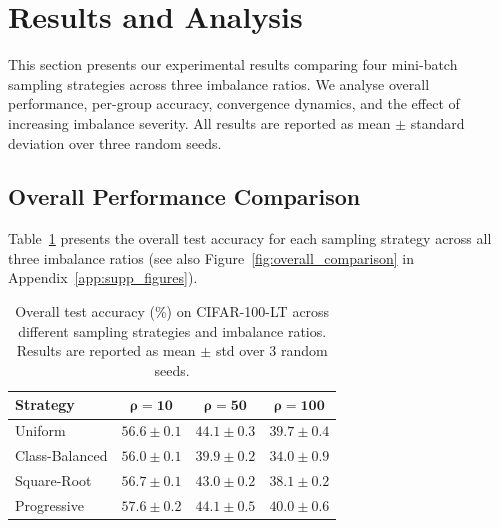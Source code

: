 \documentclass[12pt,a4paper]{article}
\begin{document}
\section{Results and Analysis}
\label{sec:results}
This section presents our experimental results comparing four mini-batch sampling strategies across three imbalance ratios. We analyse overall performance, per-group accuracy, convergence dynamics, and the effect of increasing imbalance severity. All results are reported as mean $\pm$ standard deviation over three random seeds.

\subsection{Overall Performance Comparison}

Table~\ref{tab:overall_results} presents the overall test accuracy for each sampling strategy across all three imbalance ratios (see also Figure~\ref{fig:overall_comparison} in Appendix~\ref{app:supp_figures}).

\begin{table}[H]
    \centering
    \caption{Overall test accuracy (\%) on CIFAR-100-LT across different sampling strategies and imbalance ratios. Results are reported as mean $\pm$ std over 3 random seeds.}
    \label{tab:overall_results}
    \begin{tabular}{lccc}
        \toprule
        \textbf{Strategy} & $\boldsymbol{\rho = 10}$ & $\boldsymbol{\rho = 50}$ & $\boldsymbol{\rho = 100}$ \\
        \midrule
        Uniform        & $56.6 \pm 0.1$ & $44.1 \pm 0.3$ & $39.7 \pm 0.4$ \\
        Class-Balanced & $56.0 \pm 0.1$ & $39.9 \pm 0.2$ & $34.0 \pm 0.9$ \\
        Square-Root    & $56.7 \pm 0.1$ & $43.0 \pm 0.2$ & $38.1 \pm 0.2$ \\
        Progressive    & $\mathbf{57.6 \pm 0.2}$ & $\mathbf{44.1 \pm 0.5}$ & $\mathbf{40.0 \pm 0.6}$ \\
        \bottomrule
    \end{tabular}
\end{table}
\end{document}

